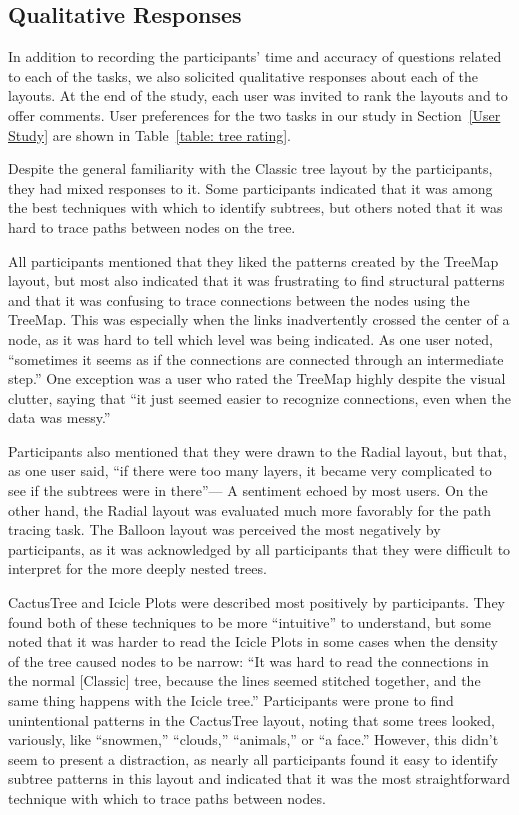 \documentclass[a4paper]{llncs}
\begin{document}
\subsection{Qualitative Responses}

In addition to recording the participants' time and accuracy of questions related to each of the tasks, we also solicited qualitative responses about each of the layouts. At the end of the study, each user was invited to rank the layouts and to offer comments. User preferences for the two tasks in our study in Section~\ref{User Study} are shown in Table~\ref{table: tree rating}.
    
Despite the general familiarity with the Classic tree layout by the participants, they had mixed responses to it. Some participants indicated that it was among the best techniques with which to identify subtrees, but others noted that it was hard to trace paths between nodes on the tree.  

    
    
    All participants mentioned that they liked the patterns created by the TreeMap layout, but most also indicated that it was frustrating to find structural patterns and that it was confusing to trace connections between the nodes using the TreeMap. This was especially when the links inadvertently crossed the center of a node, as it was hard to tell which level was being indicated. As one user noted, ``sometimes it seems as if the connections are connected through an intermediate step.'' One exception was a user who rated the TreeMap highly despite the visual clutter, saying that ``it just seemed easier to recognize connections, even when the data was messy.''
    
    Participants also mentioned that they were drawn to the Radial layout, but that, as one user said, ``if there were too many layers, it became very complicated to see if the subtrees were in there''--- A sentiment echoed by most users. On the other hand, the Radial layout was evaluated much more favorably for the path tracing task. The Balloon layout was perceived the most negatively by participants, as it was acknowledged by all participants that they were difficult to interpret for the more deeply nested trees. 
    
    CactusTree and Icicle Plots were described most positively by participants. They found both of these techniques to be more ``intuitive'' to understand, but some noted that it was harder to read the Icicle Plots in some cases when the density of the tree caused nodes to be narrow: ``It was hard to read the connections in the normal [Classic] tree, because the lines seemed stitched together, and the same thing happens with the Icicle tree.'' Participants were prone to find unintentional patterns in the CactusTree layout, noting that some trees looked, variously, like ``snowmen,'' ``clouds,'' ``animals,'' or ``a face.'' However, this didn't seem to present a distraction, as nearly all participants found it easy to identify subtree patterns in this layout and indicated that it was the most straightforward technique with which to trace paths between nodes. 
    
\end{document}
